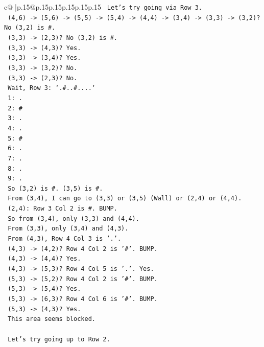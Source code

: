 \documentclass{article}
\begin{document}
{\begin{supertabular}{c@{$\;$}|p{.15\linewidth}@{}p{.15\linewidth}p{.15\linewidth}p{.15\linewidth}p{.15\linewidth}p{.15\linewidth}}
{{{\texttt{   Let's try going via Row 3.} \\
\texttt{   (4,6) {-}> (5,6) {-}> (5,5) {-}> (5,4) {-}> (4,4) {-}> (3,4) {-}> (3,3) {-}> (3,2)? No (3,2) is \#.} \\
\texttt{   (3,3) {-}> (2,3)? No (3,2) is \#.} \\
\texttt{   (3,3) {-}> (4,3)? Yes.} \\
\texttt{   (3,3) {-}> (3,4)? Yes.} \\
\texttt{   (3,3) {-}> (3,2)? No.} \\
\texttt{   (3,3) {-}> (2,3)? No.} \\
\texttt{   Wait, Row 3: `.\#..\#....`} \\
\texttt{   1: .} \\
\texttt{   2: \#} \\
\texttt{   3: .} \\
\texttt{   4: .} \\
\texttt{   5: \#} \\
\texttt{   6: .} \\
\texttt{   7: .} \\
\texttt{   8: .} \\
\texttt{   9: .} \\
\texttt{   So (3,2) is \#. (3,5) is \#.} \\
\texttt{   From (3,4), I can go to (3,3) or (3,5) (Wall) or (2,4) or (4,4).} \\
\texttt{   (2,4): Row 3 Col 2 is \#. BUMP.} \\
\texttt{   So from (3,4), only (3,3) and (4,4).} \\
\texttt{   From (3,3), only (3,4) and (4,3).} \\
\texttt{   From (4,3), Row 4 Col 3 is '.'.} \\
\texttt{   (4,3) {-}> (4,2)? Row 4 Col 2 is '\#'. BUMP.} \\
\texttt{   (4,3) {-}> (4,4)? Yes.} \\
\texttt{   (4,3) {-}> (5,3)? Row 4 Col 5 is '.'. Yes.} \\
\texttt{   (5,3) {-}> (5,2)? Row 4 Col 2 is '\#'. BUMP.} \\
\texttt{   (5,3) {-}> (5,4)? Yes.} \\
\texttt{   (5,3) {-}> (6,3)? Row 4 Col 6 is '\#'. BUMP.} \\
\texttt{   (5,3) {-}> (4,3)? Yes.} \\
\texttt{   This area seems blocked.} \\
\\ 
\texttt{   Let's try going up to Row 2.} \\
}}}
\end{supertabular}}
\end{document}
